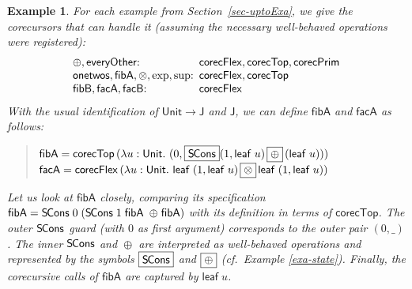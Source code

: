 \documentclass[preprint,draft]
{sigplanconf}
\newcommand\vvthinspace{\kern.041667ex}
\newcommand\vthinspace{\kern.08333ex}
\newcommand\TC{\mathsf}
\newtheorem{eexample}[theorem]{Example}
\newcommand{\ra}{\rightarrow}
\newcommand{\<}{\langle}
\renewcommand{\>}{\rangle}
\renewcommand{\eta}{{{\mathsf{leaf}}}}
\newcommand{\onetwos}{{{\mathsf{onetwos}}}}
\newcommand{\corec}{{{\mathsf{corecPrim}}}}
\newcommand\corecU{\mathsf{corecTop}}
\newcommand\corecUU{\mathsf{corecFlex}}
\newcommand{\SCons}{{{\mathsf{S\hspace*{-0.2ex}Cons}}}}
\newcommand{\opls}{\mathrel\oplus}
\newcommand{\oprd}{\mathrel\otimes}
\newcommand{\everyOther}{{{\mathsf{everyOther}}}}
\newcommand{\fibA}{{{\mathsf{fibA}}}}
\newcommand{\fibB}{{{\mathsf{fibB}}}}
\newcommand{\facA}{{{\mathsf{facA}}}}
\newcommand{\facB}{{{\mathsf{facB}}}}
\newcommand{\J}{{\TC{J}}}
\newcommand{\Unit}{{\TC{Unit}}}
\newcommand\bb[1]{\fbox{$#1$}}
\def\S{Section~}
\begin{document}
\begin{eexample}\rm \label{exa-defUpToInst}
For each example from \S\ref{sec-uptoExa}, we give
the corecursors that can handle it (assuming the
necessary well-behaved operations were registered):
$$
\begin{array}{l@{\enskip}l}
\opls, \everyOther{:} & \corecUU, \corecU, \corec \\
\onetwos, \fibA, \oprd, \exp, {\sup}{:} & \corecUU, \corecU   \\ \fibB, \facA, \facB{:} & \corecUU
\end{array}
$$
With the usual identification of $\Unit \ra \J$ and $\J$, we can define
$\fibA$ and $\facA$ as follows:
\begin{quote}
$\fibA  =  \corecU\,(\lambda u:\Unit.~(0,\vthinspace\bb{\SCons}(1,\eta\;u) \,\bb{\opls}\, (\eta\;u)))$\kern-200mm \\[1\jot]
$\facA  =  \corecUU\,(\lambda u:\Unit.~\eta\;(1,\eta\;u) \,\bb{\oprd}\, \eta\;(1,\eta\;u))$\kern-200mm \end{quote}
Let us look at $\fibA$ closely, comparing its specification
$\fibA  =  \SCons\;0\;(\SCons\;1\;\fibA \vvthinspace$ $\opls\vvthinspace \fibA)$
with its definition in terms of $\corecU$.
The outer $\SCons$ guard (with $0$ as first argument) corresponds to the outer
pair $(0,\_)$. The inner $\SCons$ and $\opls$ are interpreted as well-behaved operations
and represented by the symbols $\bb{\SCons}$ and $\bb{\opls}$ (cf.\ Example \ref{exa-state}).
Finally, the corecursive calls of $\fibA$ are captured by $\eta\;u$.


\end{eexample}
\end{document}

